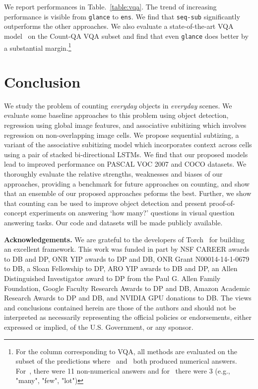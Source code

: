 \documentclass[10pt,twocolumn,letterpaper]{article}
\newcommand{\seq}{\texttt{seq-sub}\xspace}
\newcommand{\glance}{\texttt{glance}\xspace}
\newcommand{\ens}{\texttt{ens}\xspace}
\begin{document}
We report performances in Table.~\ref{table:vqa}. The trend of increasing performance is visible from \glance to \ens. We find that \seq significantly outperforms the other approaches. We also evaluate a state-of-the-art VQA model~\cite{FukuiPYRDR16} on the Count-QA VQA subset and find that even \glance does better by 
a substantial margin.\footnote{For the column corresponding to VQA, all methods are evaluated on the subset of the predictions where~\cite{Lu2015} and~\cite{FukuiPYRDR16} both produced numerical answers. For~\cite{Lu2015}, there were 11 non-numerical answers and for~\cite{FukuiPYRDR16} there were 3 (e.g., "many", "few", "lot")} 
%
 

\section{Conclusion}\label{sec:conclusion}
We study the problem of counting \emph{everyday} objects in \emph{everyday} scenes. We evaluate some baseline approaches to this problem using object detection, regression using global image features, and associative subitizing which involves regression on non-overlapping image cells. We propose sequential subtizing, a variant of the associative subitizing model which incorporates context across cells using a pair of stacked bi-directional  LSTMs. We find that our proposed models lead to improved performance on PASCAL VOC 2007 and COCO datasets. We thoroughly evaluate the relative strengths, weaknesses and biases of our approaches, providing a benchmark for future approaches on counting, and show that an ensemble of our proposed approaches peforms the best. Further, we show that counting can be used to improve object detection and present proof-of-concept experiments on answering `how many?' questions in visual question answering tasks.  
Our code and datasets will be made publicly available. 
\par \noindent
\noindent\textbf{Acknowledgements.} We are grateful to the developers of Torch~\cite{torch} for building an excellent framework. This work was funded in part by NSF CAREER awards to DB and DP, ONR YIP awards to DP and DB, ONR Grant N00014-14-1-0679 to DB, a Sloan Fellowship to DP, ARO YIP awards to DB and DP, an Allen Distinguished Investigator award to DP from the Paul G. Allen Family Foundation, Google Faculty Research Awards to DP and DB, Amazon Academic Research Awards to DP and DB, and NVIDIA GPU donations to DB. The views and conclusions contained herein are those of the authors and should not be interpreted as necessarily representing the official policies or endorsements, either expressed or implied, of the U.S. Government, or any sponsor.
%
 
\end{document}
